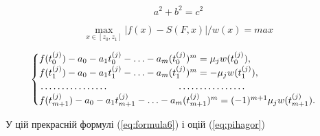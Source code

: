 \documentclass[ukrainian,14pt]{extarticle}
\begin{document}
\begin{equation}\label{eq:pihagor}
    a^2 + b^2 = c^2
\end{equation}

$$\max_{x \in [z_0, z_1]} |f(x) - S(F, x)|/w(x) = max_{}$$


\begin{equation}\label{eq:formula6}
\begin{cases}
f(t^{(j)}_0) - a_0 - a_1t^{(j)}_0 - \ldots - a_m(t_0^{(j)})^m=\mu_jw(t_0^{(j)}), \\
f(t^{(j)}_1)-a_0-a_1t^{(j)}_1 - \ldots - a_m(t^{(j)}_1)^m = - \mu_jw(t^{(j)}_1),\\
\dotfill\hfill\hbox{} \dotfill\hfill\hbox{}\\
f(t^{(j)}_{m+1}) -a_0 -a_1t^{(j)}_{m+1} - \ldots - a_m(t^{(j)}_{m+1})^m = (-1)^{m+1}\mu_jw(t^{(j)}_{m+1}).
\end{cases}
\end{equation}



У цій прекрасній формулі (\ref{eq:formula6}) і оцій (\ref{eq:pihagor})




\end{document}
